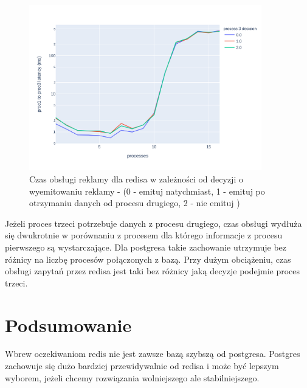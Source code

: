 \documentclass[polish, 10pt]{article}
\begin{document}
\begin{figure}[H]
    \centering
    \includegraphics[width=0.9\textwidth]{./graphs/proc_type_redis.png}
    \caption{Czas obsługi reklamy dla redisa w zależności od decyzji o wyemitowaniu reklamy - (0 - emituj natychmiast, 1 - emituj po otrzymaniu danych od procesu drugiego, 2 - nie emituj )}
\end{figure}

Jeżeli proces trzeci potrzebuje danych z procesu drugiego, czas obsługi wydłuża się dwukrotnie w porównaniu z procesem dla którego informacje z procesu pierwszego są wystarczające. Dla postgresa takie zachowanie utrzymuje bez różnicy na liczbę procesów połączonych z bazą. Przy dużym obciążeniu, czas obsługi zapytań przez redisa jest taki bez różnicy jaką decyzje podejmie proces trzeci.

\section{Podsumowanie}
Wbrew oczekiwaniom redis nie jest zawsze bazą szybszą od postgresa. Postgres zachowuje się dużo bardziej przewidywalnie od redisa i może być lepszym wyborem, jeżeli chcemy rozwiązania wolniejszego ale stabilniejszego.
\end{document}
